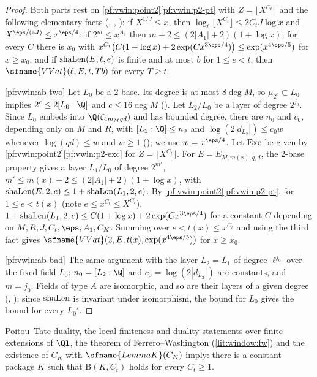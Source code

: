 \begin{proof}
Both parts rest on \cref{pf:vwin:point2}\ref{pf:vwin:p2-pt} with $Z=\lfloor X^{C_t}\rfloor$ and the following elementary facts
(, , ): if $X^{1/J}\le x$, then
$\log_\ell\lfloor X^{C_t}\rfloor\le2C_tJ\log x$ and $X^{\eps/(4J)}\le x^{\eps/4}$; if $2^m\le x^{A_1}$ then $m+2\le(2|A_1|+2)(1+\log x)$; for
every $C$ there is $x_0$ with $x^{C_t}\bigl(C(1+\log x)+2\exp(Cx^{3\eps/4})\bigr)\le\exp(x^{4\eps/5})$ for $x\ge x_0$; and if
$\mathrm{shaLen}(E,\ell,e)$ is finite and at most $b$ for $1\le e<t$, then $\sfname{VVat}(\ell,E,t,Tb)$ for every $T\ge t$.

\ref{pf:vwin:ab-two} Let $L_0$ be a $2$-base. Its degree is at most $8\deg M$, so $\mu_{2^c}\subset L_0$ implies $2^c\le2[L_0:\Q]$ and $c\le16\deg M$
(). Let $L_2/L_0$ be a layer of degree $2^{j_0}$. Since $L_0$ embeds into $\Q(\zeta_{4m_Mqd})$ and has bounded
degree, there are $n_0$ and $c_0$, depending only on $M$ and $R$, with $[L_2:\Q]\le n_0$ and $\log(2|d_{L_2}|)\le c_0w$ whenever
$\log(qd)\le w$ and $w\ge1$ (); we use $w=x^{\eps/4}$. Let $\mathrm{Exc}$ be given by
\cref{pf:vwin:point2}\ref{pf:vwin:p2-exc} for $Z=\lfloor X^{C_t}\rfloor$. For $E=E_{M,m(x),q,d}$, the $2$-base property gives a layer $L_1/L_0$ of
degree $2^{m'}$, $m'\le m(x)+2\le(2|A_1|+2)(1+\log x)$, with $\mathrm{shaLen}(E,2,e)\le1+\mathrm{shaLen}(L_1,2,e)$. By \cref{pf:vwin:point2}\ref{pf:vwin:p2-pt}, for
$1\le e<t(x)$ (note $e\le x^{C_t}\le X^{C_t}$),
$1+\vwinsh(L_1,2,e)\le C(1+\log x)+2\exp(Cx^{3\eps/4})$ for a constant $C$ depending on $M,R,J,C_t,\eps,A_1,C_K$. Summing over $e<t(x)\le x^{C_t}$
and using the third fact gives $\sfname{VVat}(2,E,t(x),\exp(x^{4\eps/5}))$ for $x\ge x_0$.

\ref{pf:vwin:ab-bad} The same argument with the layer $L_2=L_1$ of degree $\ell^{j_0}$ over the fixed field $L_0$: $n_0=[L_2:\Q]$ and
$c_0=\log(2|d_{L_2}|)$ are constants, and $m=j_0$. Fields of type $A$ are isomorphic, and so are their layers of a given degree
(, ); since $\mathrm{shaLen}$ is invariant under isomorphism, the bound
for $L_0$ gives the bound for every $L_0'$.
\end{proof}

\begin{theorem}\label{pf:vwin:bab}
Poitou--Tate duality, the local finiteness and duality statements over finite extensions of $\Ql$, the theorem of
Ferrero--Washington (\cref{lit:window:fw}) and the existence of $C_K$ with $\sfname{LemmaK}(C_K)$ imply: there is a constant package
$K$ such that $\mathrm{B}(K,C_t)$ holds for every $C_t\ge1$.
\end{theorem}

